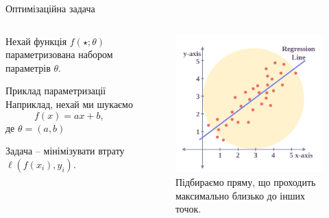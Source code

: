 \documentclass[xcolor={usenames,dvipsnames}]{beamer}
\begin{document}
    \begin{frame}{Оптимізаційна задача}
        \begin{columns}
            \begin{column}{0.5\textwidth}
                Нехай функція $f(\star;\theta)$ параметризована набором параметрів $\theta$. 

                \begin{exampleblock}{Приклад параметризації}
                    Наприклад, нехай ми шукаємо
                    \begin{equation*}
                        f(x) = a x + b,
                    \end{equation*}
                    де $\theta=(a,b)$
                \end{exampleblock}

                Задача -- мінімізувати втрату $\ell(f(x_i),y_i)$.
            \end{column}
            \begin{column}{0.5\textwidth}
                \begin{figure}
                    \centering
                    \includegraphics[width=\textwidth]{images/regression.png}
                    \caption{Підбираємо пряму, що проходить максимально близько до інших точок.}
                \end{figure}
            \end{column}
        \end{columns}
    \end{frame}
    
\end{document}
